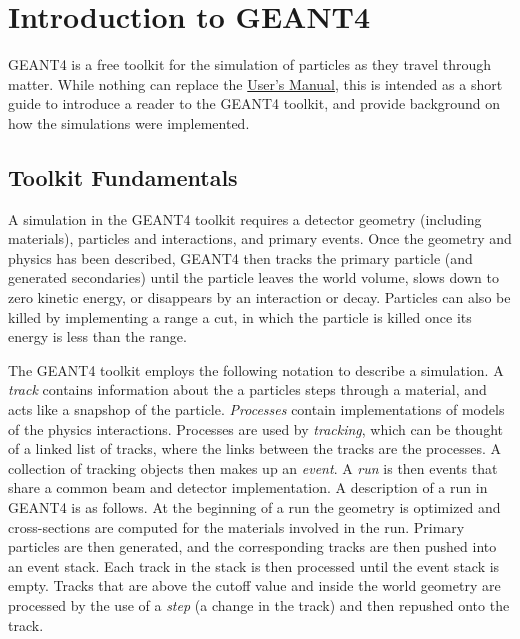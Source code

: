 \chapter{Introduction to GEANT4}
\label{chap:G4Intro}
GEANT4 is a free toolkit for the simulation of particles as they travel through matter.
While nothing can replace the \href{http://geant4.web.cern.ch/geant4/G4UsersDocuments/UsersGuides/ForApplicationDeveloper/html/index.html}{User's Manual}, this is intended as a short guide to introduce a reader to the GEANT4 toolkit, and provide background on how the simulations were implemented.

\section{Toolkit Fundamentals}
A simulation in the GEANT4 toolkit requires a detector geometry (including materials), particles and interactions, and primary events.
Once the geometry and physics has been described, GEANT4 then tracks the primary particle (and generated secondaries) until the particle leaves the world volume, slows down to zero kinetic energy, or disappears by an interaction or decay. 
Particles can also be killed by implementing a range a cut, in which the particle is killed once its energy is less than the range.

The GEANT4 toolkit employs the following notation to describe a simulation.
A \textit{track} contains information about the a particles steps through a material, and acts like a snapshop of the particle.
\textit{Processes} contain implementations of models of the physics interactions.
Processes are used by \textit{tracking}, which can be thought of a linked list of tracks, where the links between the tracks are the processes.
A collection of tracking objects then makes up an \textit{event}.
A \textit{run} is then events that share a common beam and detector implementation.
A description of a run in GEANT4 is as follows.
At the beginning of a run the geometry is optimized and cross-sections are computed for the materials involved in the run.
Primary particles are then generated, and the corresponding tracks are then pushed into an event stack.
Each track in the stack is then processed until the event stack is empty.
Tracks that are above the cutoff value and inside the world geometry are processed by the use of a \textit{step} (a change in the track) and then repushed onto the track.

